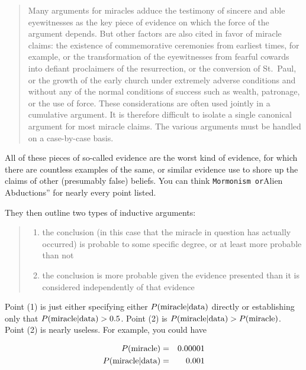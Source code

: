 \documentclass{tufte-book}
\begin{document}
\begin{quote}
Many arguments for miracles adduce the testimony of sincere and able
eyewitnesses as the key piece of evidence on which the force of the
argument depends. But other factors are also cited in favor of miracle
claims: the existence of commemorative ceremonies from earliest times,
for example, or the transformation of the eyewitnesses from fearful
cowards into defiant proclaimers of the resurrection, or the conversion
of St.~Paul, or the growth of the early church under extremely adverse
conditions and without any of the normal conditions of success such as
wealth, patronage, or the use of force. These considerations are often
used jointly in a cumulative argument. It is therefore difficult to
isolate a single canonical argument for most miracle claims. The various
arguments must be handled on a case-by-case basis.
\end{quote}

All of these pieces of so-called evidence are the worst kind of
evidence, for which there are countless examples of the same, or similar
evidence use to shore up the claims of other (presumably false) beliefs.
You can think
\texttt{Mormonism\textquotesingle{}\textquotesingle{}\ or}Alien
Abductions'' for nearly every point listed.

They then outline two types of inductive arguments:

\begin{quote}
\begin{enumerate}
\def\labelenumi{\arabic{enumi}.}
\itemsep1pt\parskip0pt
\item
  the conclusion (in this case that the miracle in question has actually
  occurred) is probable to some specific degree, or at least more
  probable than not
\item
  the conclusion is more probable given the evidence presented than it
  is considered independently of that evidence
\end{enumerate}
\end{quote}

Point (1) is just either specifying either
\(P({\rm miracle}|{\rm data})\) directly or establishing only that
\(P({\rm miracle}|{\rm data})>0.5\). Point (2) is
\(P({\rm miracle}|{\rm data})>P({\rm miracle})\). Point (2) is nearly
useless. For example, you could have

\begin{eqnarray*}
P({\rm miracle})&=&0.00001 \\
P({\rm miracle}|{\rm data})&=&0.001
\end{eqnarray*}
\end{document}
